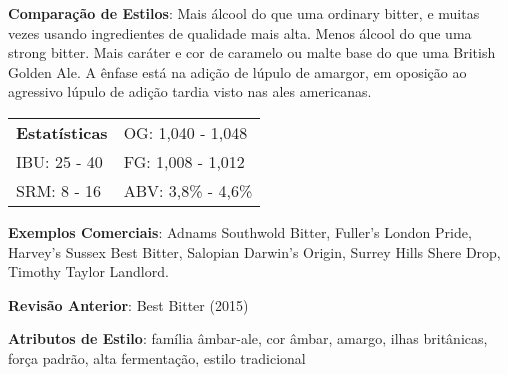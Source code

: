 \textbf{Comparação de Estilos}: Mais álcool do que uma ordinary bitter, e muitas vezes usando ingredientes de qualidade mais alta. Menos álcool do que uma strong bitter. Mais caráter e cor de caramelo ou malte base do que uma British Golden Ale. A ênfase está na adição de lúpulo de amargor, em oposição ao agressivo lúpulo de adição tardia visto nas ales americanas.

\begin{tabular}{@{}p{35mm}p{35mm}@{}}
  \textbf{Estatísticas} & OG: 1,040 - 1,048 \\
  IBU: 25 - 40  & FG: 1,008 - 1,012  \\
  SRM: 8 - 16  & ABV: 3,8\% - 4,6\%
\end{tabular}

\textbf{Exemplos Comerciais}: Adnams Southwold Bitter, Fuller's London Pride, Harvey's Sussex Best Bitter, Salopian Darwin’s Origin, Surrey Hills Shere Drop, Timothy Taylor Landlord.

\textbf{Revisão Anterior}: Best Bitter (2015)

\textbf{Atributos de Estilo}: família âmbar-ale, cor âmbar, amargo, ilhas britânicas, força padrão, alta fermentação, estilo tradicional
